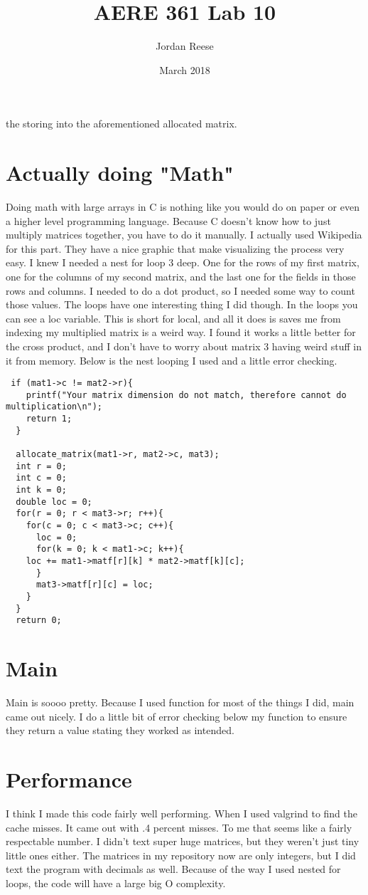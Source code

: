 \documentclass{article} \usepackage[utf8]{inputenc} \title{AERE 361 Lab 10} \author{Jordan Reese} \date{March 2018} \usepackage{listings} \usepackage{color} \definecolor{dkgreen}{rgb}{0,0.6,0} \definecolor{gray}{rgb}{0.5,0.5,0.5}
\begin{document}
the storing into the aforementioned allocated matrix. \section*{Actually doing "Math"} \indent Doing math with large arrays in C is nothing like you would do on paper or even a higher level programming language. Because C doesn't 
know how to just multiply matrices together, you have to do it manually. I actually used Wikipedia for this part. They have a nice graphic that make visualizing the process very easy. I knew I needed a nest for loop 3 deep. One 
for the rows of my first matrix, one for the columns of my second matrix, and the last one for the fields in those rows and columns. I needed to do a dot product, so I needed some way to count those values. The loops have one 
interesting thing I did though. In the loops you can see a loc variable. This is short for local, and all it does is saves me from indexing my multiplied matrix is a weird way. I found it works a little better for the cross 
product, and I don't have to worry about matrix 3 having weird stuff in it from memory. Below is the nest looping I used and a little error checking. \begin{lstlisting}
 if (mat1->c != mat2->r){
    printf("Your matrix dimension do not match, therefore cannot do multiplication\n");
    return 1;
  }
  
  allocate_matrix(mat1->r, mat2->c, mat3);
  int r = 0;
  int c = 0;
  int k = 0;
  double loc = 0;
  for(r = 0; r < mat3->r; r++){
    for(c = 0; c < mat3->c; c++){
      loc = 0;
      for(k = 0; k < mat1->c; k++){
	loc += mat1->matf[r][k] * mat2->matf[k][c];
      }
      mat3->matf[r][c] = loc;
    }
  }
  return 0; \end{lstlisting} \section*{Main} \indent Main is soooo pretty. Because I used function for most of the things I did, main came out nicely. I do a little bit of error checking below my function to ensure they return a 
value stating they worked as intended. \section*{Performance} \indent I think I made this code fairly well performing. When I used valgrind to find the cache misses. It came out with .4 percent misses. To me that seems like a 
fairly respectable number. I didn't text super huge matrices, but they weren't just tiny little ones either. The matrices in my repository now are only integers, but I did text the program with decimals as well. Because of the 
way I used nested for loops, the code will have a large big O complexity. 
\end{document}
